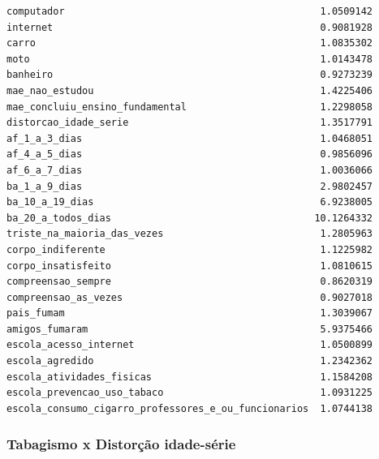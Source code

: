 \documentclass[
]{article}
\begin{document}
\begin{verbatim}
computador                                            1.0509142
internet                                              0.9081928
carro                                                 1.0835302
moto                                                  1.0143478
banheiro                                              0.9273239
mae_nao_estudou                                       1.4225406
mae_concluiu_ensino_fundamental                       1.2298058
distorcao_idade_serie                                 1.3517791
af_1_a_3_dias                                         1.0468051
af_4_a_5_dias                                         0.9856096
af_6_a_7_dias                                         1.0036066
ba_1_a_9_dias                                         2.9802457
ba_10_a_19_dias                                       6.9238005
ba_20_a_todos_dias                                   10.1264332
triste_na_maioria_das_vezes                           1.2805963
corpo_indiferente                                     1.1225982
corpo_insatisfeito                                    1.0810615
compreensao_sempre                                    0.8620319
compreensao_as_vezes                                  0.9027018
pais_fumam                                            1.3039067
amigos_fumaram                                        5.9375466
escola_acesso_internet                                1.0500899
escola_agredido                                       1.2342362
escola_atividades_fisicas                             1.1584208
escola_prevencao_uso_tabaco                           1.0931225
escola_consumo_cigarro_professores_e_ou_funcionarios  1.0744138
\end{verbatim}

\hypertarget{tabagismo-x-distoruxe7uxe3o-idade-suxe9rie}{%
\subsubsection{Tabagismo x Distorção
idade-série}\label{tabagismo-x-distoruxe7uxe3o-idade-suxe9rie}}
\end{document}
